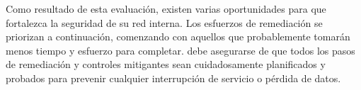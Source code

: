 \qquad Como resultado de esta evaluación, existen varias oportunidades para que \enterpriseName fortalezca la seguridad de su red interna.
Los esfuerzos de remediación se priorizan a continuación, comenzando con aquellos que probablemente tomarán menos tiempo y esfuerzo para
completar. \enterpriseName debe asegurarse de que todos los pasos de remediación y controles mitigantes sean cuidadosamente planificados y probados
para prevenir cualquier interrupción de servicio o pérdida de datos.
